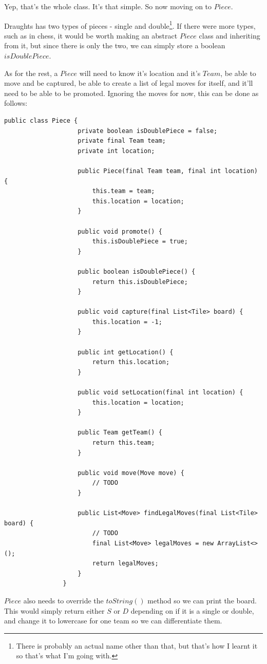 \documentclass[a4paper]{report}
\begin{document}
			Yep, that's the whole class. It's that simple. So now moving on to $Piece$.
			
			Draughts has two types of pieces - single and double\footnote{There is probably an actual name other than that, but that's how I learnt it so that's what I'm going with.}. If there were more types, such as in chess, it would be worth making an abstract $Piece$ class and inheriting from it, but since there is only the two, we can simply store a boolean $isDoublePiece$.
			
			As for the rest, a $Piece$ will need to know it's location and it's $Team$, be able to move and be captured, be able to create a list of legal moves for itself, and it'll need to be able to be promoted. Ignoring the moves for now, this can be done as follows:
			
			\begin{lstlisting}[frame=top, caption=Piece.java]
				public class Piece {
					private boolean isDoublePiece = false;
					private final Team team;
					private int location;
					
					public Piece(final Team team, final int location) {
						this.team = team;
						this.location = location;
					}
					
					public void promote() {
						this.isDoublePiece = true;
					}
					
					public boolean isDoublePiece() {
						return this.isDoublePiece;
					}
					
					public void capture(final List<Tile> board) {
						this.location = -1;
					}
					
					public int getLocation() {
						return this.location;
					}
					
					public void setLocation(final int location) {
						this.location = location;
					}
					
					public Team getTeam() {
						return this.team;
					}
					
					public void move(Move move) {
						// TODO
					}
					
					public List<Move> findLegalMoves(final List<Tile> board) {
						// TODO
						final List<Move> legalMoves = new ArrayList<>();
						return legalMoves;
					}
				}
			\end{lstlisting} \bigskip
			
			$Piece$ also needs to override the $toString()$ method so we can print the board. This would simply return either $S$ or $D$ depending on if it is a single or double, and change it to lowercase for one team so we can differentiate them.
			
\end{document}
